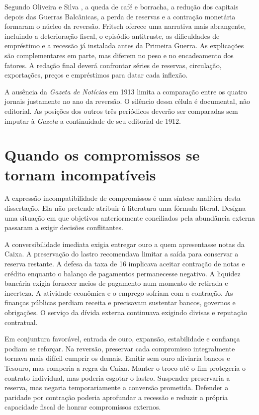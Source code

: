 Segundo Oliveira e Silva \cite{oliveirasilva2001}, a queda de café e borracha, a redução dos capitais depois das Guerras Balcânicas, a perda de reservas e a contração monetária formaram o núcleo da reversão. Fritsch \cite{fritsch1990} oferece uma narrativa mais abrangente, incluindo a deterioração fiscal, o episódio antitruste, as dificuldades de empréstimo e a recessão já instalada antes da Primeira Guerra. As explicações são complementares em parte, mas diferem no peso e no encadeamento dos fatores. A redação final deverá confrontar séries de reservas, circulação, exportações, preços e empréstimos para datar cada inflexão.


A ausência da \textit{Gazeta de Notícias} em 1913 limita a comparação entre os quatro jornais justamente no ano da reversão. O silêncio dessa célula é documental, não editorial. As posições dos outros três periódicos deverão ser comparadas sem imputar à \textit{Gazeta} a continuidade de seu editorial de 1912.

\section{Quando os compromissos se tornam incompatíveis}

A expressão incompatibilidade de compromissos é uma síntese analítica desta dissertação. Ela não pretende atribuir à literatura uma fórmula literal. Designa uma situação em que objetivos anteriormente conciliados pela abundância externa passaram a exigir decisões conflitantes.

A conversibilidade imediata exigia entregar ouro a quem apresentasse notas da Caixa. A preservação do lastro recomendava limitar a saída para conservar a reserva restante. A defesa da taxa de 16 implicava aceitar contração de notas e crédito enquanto o balanço de pagamentos permanecesse negativo. A liquidez bancária exigia fornecer meios de pagamento num momento de retirada e incerteza. A atividade econômica e o emprego sofriam com a contração. As finanças públicas perdiam receita e precisavam sustentar bancos, governos e obrigações. O serviço da dívida externa continuava exigindo divisas e reputação contratual.

Em conjuntura favorável, entrada de ouro, expansão, estabilidade e confiança podiam se reforçar. Na reversão, preservar cada compromisso integralmente tornava mais difícil cumprir os demais. Emitir sem ouro aliviaria bancos e Tesouro, mas romperia a regra da Caixa. Manter o troco até o fim protegeria o contrato individual, mas poderia esgotar o lastro. Suspender preservaria a reserva, mas negaria temporariamente a conversão prometida. Defender a paridade por contração poderia aprofundar a recessão e reduzir a própria capacidade fiscal de honrar compromissos externos.


